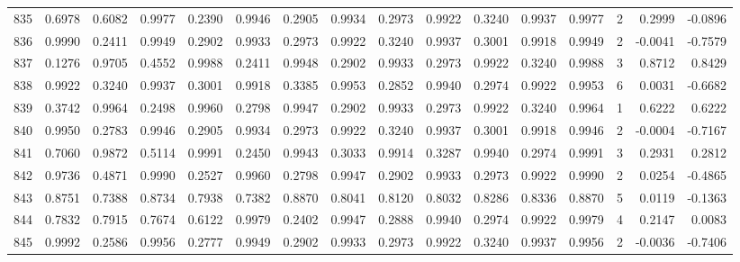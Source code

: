 \begin{tabular}{lrrrrrrrrrrrrrrr}
835 &      0.6978 &  0.6082 &  0.9977 &  0.2390 &  0.9946 &  0.2905 &  0.9934 &  0.2973 &  0.9922 &  0.3240 &   0.9937 &     0.9977 &      2 &                    0.2999 &                    -0.0896 \\
836 &      0.9990 &  0.2411 &  0.9949 &  0.2902 &  0.9933 &  0.2973 &  0.9922 &  0.3240 &  0.9937 &  0.3001 &   0.9918 &     0.9949 &      2 &                   -0.0041 &                    -0.7579 \\
837 &      0.1276 &  0.9705 &  0.4552 &  0.9988 &  0.2411 &  0.9948 &  0.2902 &  0.9933 &  0.2973 &  0.9922 &   0.3240 &     0.9988 &      3 &                    0.8712 &                     0.8429 \\
838 &      0.9922 &  0.3240 &  0.9937 &  0.3001 &  0.9918 &  0.3385 &  0.9953 &  0.2852 &  0.9940 &  0.2974 &   0.9922 &     0.9953 &      6 &                    0.0031 &                    -0.6682 \\
839 &      0.3742 &  0.9964 &  0.2498 &  0.9960 &  0.2798 &  0.9947 &  0.2902 &  0.9933 &  0.2973 &  0.9922 &   0.3240 &     0.9964 &      1 &                    0.6222 &                     0.6222 \\
840 &      0.9950 &  0.2783 &  0.9946 &  0.2905 &  0.9934 &  0.2973 &  0.9922 &  0.3240 &  0.9937 &  0.3001 &   0.9918 &     0.9946 &      2 &                   -0.0004 &                    -0.7167 \\
841 &      0.7060 &  0.9872 &  0.5114 &  0.9991 &  0.2450 &  0.9943 &  0.3033 &  0.9914 &  0.3287 &  0.9940 &   0.2974 &     0.9991 &      3 &                    0.2931 &                     0.2812 \\
842 &      0.9736 &  0.4871 &  0.9990 &  0.2527 &  0.9960 &  0.2798 &  0.9947 &  0.2902 &  0.9933 &  0.2973 &   0.9922 &     0.9990 &      2 &                    0.0254 &                    -0.4865 \\
843 &      0.8751 &  0.7388 &  0.8734 &  0.7938 &  0.7382 &  0.8870 &  0.8041 &  0.8120 &  0.8032 &  0.8286 &   0.8336 &     0.8870 &      5 &                    0.0119 &                    -0.1363 \\
844 &      0.7832 &  0.7915 &  0.7674 &  0.6122 &  0.9979 &  0.2402 &  0.9947 &  0.2888 &  0.9940 &  0.2974 &   0.9922 &     0.9979 &      4 &                    0.2147 &                     0.0083 \\
845 &      0.9992 &  0.2586 &  0.9956 &  0.2777 &  0.9949 &  0.2902 &  0.9933 &  0.2973 &  0.9922 &  0.3240 &   0.9937 &     0.9956 &      2 &                   -0.0036 &                    -0.7406 \\

\end{tabular}
